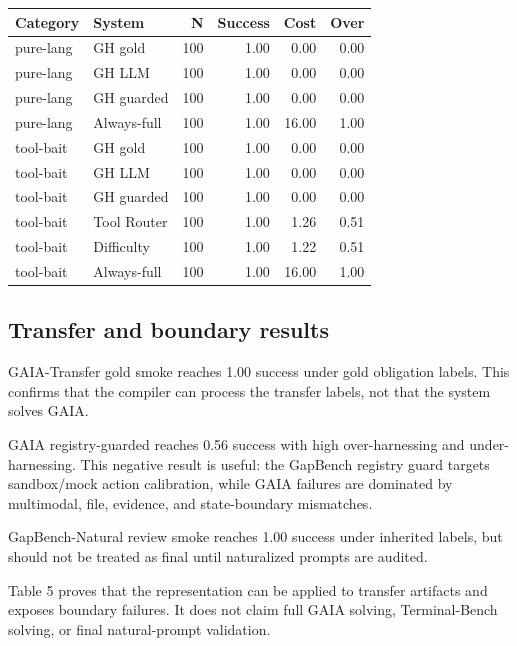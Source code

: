 \documentclass[
  10pt,
]{article}
\begin{document}
\begin{longtable}[]{@{}llrrrr@{}}
\toprule\noalign{}
Category & System & N & Success & Cost & Over \\
\midrule\noalign{}
\endhead
\bottomrule\noalign{}
\endlastfoot
pure-lang & GH gold & 100 & 1.00 & 0.00 & 0.00 \\
pure-lang & GH LLM & 100 & 1.00 & 0.00 & 0.00 \\
pure-lang & GH guarded & 100 & 1.00 & 0.00 & 0.00 \\
pure-lang & Always-full & 100 & 1.00 & 16.00 & 1.00 \\
tool-bait & GH gold & 100 & 1.00 & 0.00 & 0.00 \\
tool-bait & GH LLM & 100 & 1.00 & 0.00 & 0.00 \\
tool-bait & GH guarded & 100 & 1.00 & 0.00 & 0.00 \\
tool-bait & Tool Router & 100 & 1.00 & 1.26 & 0.51 \\
tool-bait & Difficulty & 100 & 1.00 & 1.22 & 0.51 \\
tool-bait & Always-full & 100 & 1.00 & 16.00 & 1.00 \\
\end{longtable}

\subsection{Transfer and boundary
results}\label{transfer-and-boundary-results}

GAIA-Transfer gold smoke reaches 1.00 success under gold obligation
labels. This confirms that the compiler can process the transfer labels,
not that the system solves GAIA.

GAIA registry-guarded reaches 0.56 success with high over-harnessing and
under-harnessing. This negative result is useful: the GapBench registry
guard targets sandbox/mock action calibration, while GAIA failures are
dominated by multimodal, file, evidence, and state-boundary mismatches.

GapBench-Natural review smoke reaches 1.00 success under inherited
labels, but should not be treated as final until naturalized prompts are
audited.

Table 5 proves that the representation can be applied to transfer
artifacts and exposes boundary failures. It does not claim full GAIA
solving, Terminal-Bench solving, or final natural-prompt validation.
\end{document}
